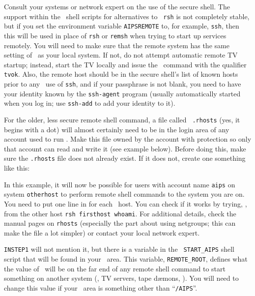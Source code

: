 Consult your systems or network expert on the use of the secure shell.
The support within the \AIPS\ shell scripts for alternatives to {\tt
rsh} is not completely stable, but if you set the environment variable
{\tt AIPSREMOTE} to, for example, {\tt ssh}, then this will be used in
place of {\tt rsh} or {\tt remsh} when trying to start up services
remotely.  You will need to make sure that the remote system has the
same setting of \AROOT\ as your local system.  If not, do not attempt
automatic remote TV startup; instead, start the TV locally and issue the
\ttaips\ command with the qualifier {\tt tvok}.  Also, the remote host
should be in the secure shell's list of known hosts prior to any
\AIPS\ use of {\tt ssh}, and if your passphrase is not blank, you need
to have your identity known by the {\tt ssh-agent} program (usually
automatically started when you log in; use {\tt ssh-add} to add your
identity to it).

For the older, less secure remote shell command, a file called {\tt
.rhosts} (yes, it begins with a dot) will almost certainly need to be in
the login area of any account used to run \AIPS.  Make this file owned
by the account with protection so only that account can read and write
it (see example below).  Before doing this, make sure the {\tt .rhosts}
file does not already exist.  If it does not, create one something like
this: \medskip

\vfill\eject %

\medskip

\noindent In this example, it will now be possible for users with
account name {\tt aips} on system {\tt otherhost} to perform remote
shell commands to the system you are on.  You need to put one line in
for each \AIPS\ host.  You can check if it works by trying, \eg, from
the other host {\tt rsh firsthost whoami}.  For additional details,
check the manual pages on {\tt rhosts} (especially the part about using
netgroups; this can make the file a lot simpler) or contact your local
network expert.

{\tt INSTEP1} will not mention it, but there is a variable in the {\tt
START\_AIPS} shell script that will be found in your \AROOT\ area.  This
variable, {\tt REMOTE\_ROOT}, defines what the value of \AROOT\ will be
on the far end of any remote shell command to start something on another
system (\eg, TV servers, tape d\ae mons, \etc).  You will need to change
this value if your \AROOT\ area is something other than ``{\tt /AIPS}''.

